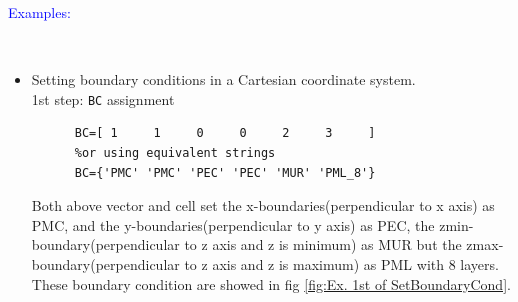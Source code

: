 	\textcolor{blue}{\begin{large}Examples:\end{large}}\\
\begin{itemize}
 \item    Setting boundary conditions in a Cartesian coordinate system.\\
       1st step: \texttt{BC} assignment
    \begin{myindentpar}
	  \begin{lstlisting}[caption={BC assignment as fig \ref{fig:Ex. 1st of SetBoundaryCond} },label={listing:1st SettingofBC}]
	  %using numbers 
	  BC=[ 1     1     0     0     2     3     ] 
	  %or using equivalent strings
	  BC={'PMC' 'PMC' 'PEC' 'PEC' 'MUR' 'PML_8'} 
		      \end{lstlisting}
	  Both above vector and cell set  the x-boundaries(perpendicular to x axis) as PMC, and the y-boundaries(perpendicular to y axis) as PEC, the zmin-boundary(perpendicular to z axis and z is minimum) as MUR but the zmax-boundary(perpendicular to z axis and z is maximum) as PML with 8 layers. These boundary condition are showed in fig \ref{fig:Ex. 1st of SetBoundaryCond}.
	      \begin{figure}[ht]
		      \centering
		    \qquad
		    \qquad 

\end{figure}
\end{myindentpar}
\end{itemize}
